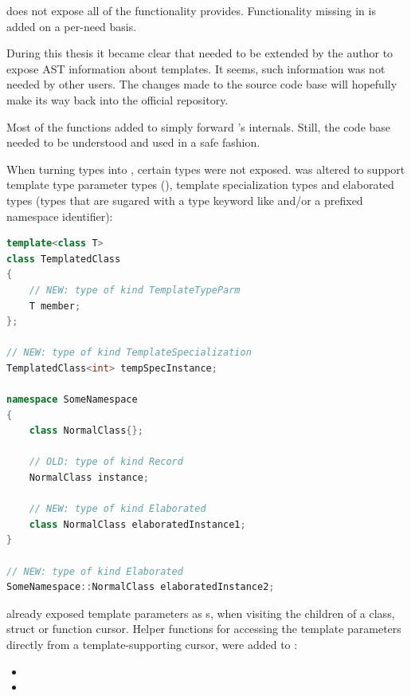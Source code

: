  does not expose all of the functionality  provides. Functionality missing in  is added on a per-need basis. 

During this thesis it became clear that  needed to be extended by the author to expose AST information about  templates. It seems, such information was not needed by other  users. The changes made to the  source code base will hopefully make its way back into the official  repository.

Most of the functions added to  simply forward 's internals. Still, the  code base needed to be understood and used in a safe fashion.

When turning  types into , certain  types were not exposed.  was altered to support template type parameter types (), template specialization types and elaborated types (types that are sugared with a type keyword like  and/or a prefixed namespace identifier):

\SingleSpacing
\begin{lstlisting}[language=C++, caption=Examples of types now supported by \myProperName{libclang}]
template<class T>
class TemplatedClass
{
	// NEW: type of kind TemplateTypeParm
	T member; 
};

// NEW: type of kind TemplateSpecialization
TemplatedClass<int> tempSpecInstance; 

namespace SomeNamespace
{	
	class NormalClass{};
	
	// OLD: type of kind Record
	NormalClass instance;
	
	// NEW: type of kind Elaborated
	class NormalClass elaboratedInstance1;
}

// NEW: type of kind Elaborated
SomeNamespace::NormalClass elaboratedInstance2; 
\end{lstlisting}
\OnehalfSpacing

 already exposed template parameters as s, when visiting the children of a class, struct or function cursor. Helper functions for accessing the template parameters directly from a template-supporting cursor, were added to :

\begin{itemize}\addtolength{\itemsep}{-0.5\baselineskip}
\item {}
\item {}
\end{itemize}

